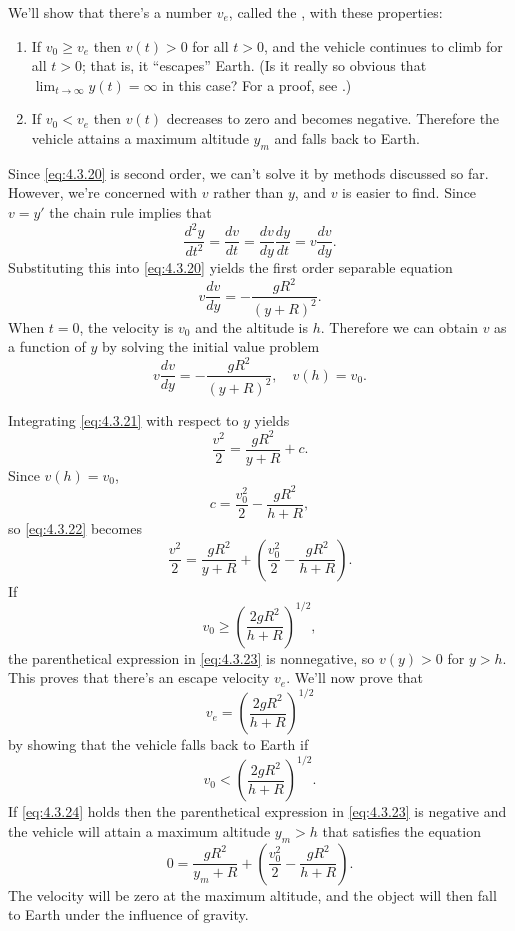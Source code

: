 We'll show that there's a number $v_e$, called the
, with these properties:

\begin{enumerate}
\item If $v_0\ge v_e$ then $v(t)>0$ for all $t>0$, and the vehicle
continues to climb for all $t>0$; that is, it ``escapes'' Earth.
(Is it really so obvious that $\lim_{t\to\infty}y(t)=\infty$
in this case? For a proof, see .)
\item  If $v_0<v_e$  then  $v(t)$   decreases to zero and becomes negative.
Therefore
 the vehicle attains a  maximum
altitude  $y_m$ and
falls back to Earth.
 \end{enumerate}

Since
\eqref{eq:4.3.20} is second order, we can't solve it by methods discussed
so far. However, we're concerned with $v$ rather than $y$, and $v$ is
easier to find. Since $v=y'$ the chain rule implies that
\[
\frac{d^2y}{dt^2}=\frac{dv}{dt}=\frac{dv}{dy}\frac{dy}{dt}=v\frac{dv}{dy}.
\]
 Substituting this into \eqref{eq:4.3.20} yields the first order
separable equation
\begin{equation} \label{eq:4.3.21}
v\frac{dv}{dy}=-\frac{gR^2}{(y+R)^2}.
\end{equation}
When $t=0$, the velocity is $v_0$ and the altitude is $h$. Therefore
we can
obtain $v$ as a function of $y$ by solving the initial value problem
\[
v\frac{dv}{dy}=-\frac{gR^2}{(y+R)^2},\quad  v(h)=v_0.
\]

Integrating \eqref{eq:4.3.21} with respect to $y$ yields
\begin{equation} \label{eq:4.3.22}
\frac{v^2}{2}=\frac{gR^2}{y+R}+c.
\end{equation}
 Since $v(h)=v_0$,
\[
c=\frac{v_0^2}{2}-\frac{gR^2}{h+R},
\]
 so \eqref{eq:4.3.22} becomes
\begin{equation} \label{eq:4.3.23}
\frac{v^2}{2}=\frac{gR^2}{y+R}+\left(\frac{v_0^2}{2}-
\frac{gR^2}{h+R}\right).
\end{equation}
If
\[
v_0 \ge\left(\frac{2gR^2}{h+R}\right)^{1/2},
\]
 the parenthetical expression in \eqref{eq:4.3.23}  is nonnegative,
 so $v(y)>0$ for $y>h$. This proves that there's an escape
velocity $v_e$. We'll now prove that
\[
v_e=\left(\frac{2gR^2}{h+R}\right)^{1/2}
\]
by showing that the vehicle falls back to Earth if
\begin{equation} \label{eq:4.3.24}
v_0 <\left(\frac{2gR^2}{h+R}\right)^{1/2}.
\end{equation}
If \eqref{eq:4.3.24}  holds then  the parenthetical expression in
\eqref{eq:4.3.23}
is negative and the vehicle will attain a maximum altitude $y_m>h$
that satisfies the equation
\[
0=\frac{gR^2}{y_m+R}+\left(\frac{v_0^2}{2}-
\frac{gR^2}{h+R}\right).
\]
The velocity will be zero at the maximum  altitude, and the object will
then fall to Earth under the influence of gravity.


